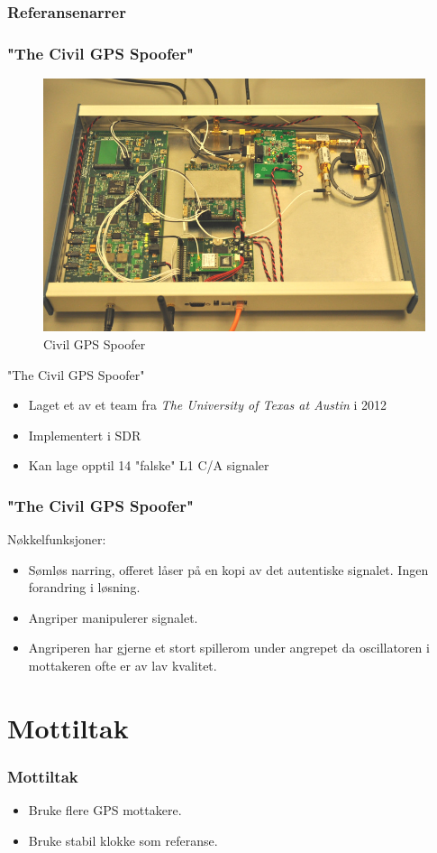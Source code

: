 \documentclass[xcolor=table]{beamer}
\begin{document}
\subsubsection{Referansenarrer}
\begin{frame}
  \frametitle{"The Civil GPS Spoofer"}
  \begin{figure}
    \includegraphics[scale=0.2]{pics/texas_spoofer.jpg}
    \caption{Civil GPS Spoofer}
  \end{figure}
  "The Civil GPS Spoofer"
  \begin{itemize}
    \item Laget et av et team fra \textit{The University of Texas at Austin} i 2012 \cite{EVPMUGA}
    \item Implementert i SDR
    \item Kan lage opptil 14 "falske" L1 C/A signaler
  \end{itemize}
\end{frame}

\begin{frame}
  \frametitle{"The Civil GPS Spoofer"}
  Nøkkelfunksjoner:
  \begin{itemize}
    \item Sømløs narring, offeret låser på en kopi av det autentiske signalet. Ingen forandring i løsning.
    \item Angriper manipulerer signalet.
    \item Angriperen har gjerne et stort spillerom under angrepet da oscillatoren i mottakeren ofte er av lav kvalitet.
  \end{itemize}
\end{frame}

\section{Mottiltak}
\begin{frame}
\frametitle{Mottiltak}
  \begin{itemize}
    \item Bruke flere GPS mottakere.
    \item Bruke stabil klokke som referanse.
  \end{itemize}
\end{frame}
\end{document}
